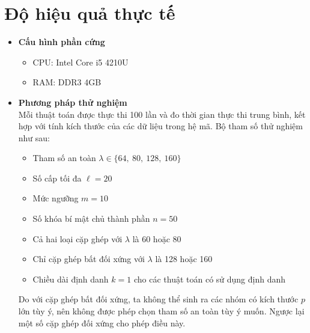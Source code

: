 \documentclass[class=report, crop=false]{standalone}
\begin{document}
	\newpage
	\section{Độ hiệu quả thực tế}
		
		\begin{itemize}
			\item[] {\sffamily\bfseries Cấu hình phần cứng}
			\begin{itemize}
				\item CPU: Intel Core i5 4210U
				\item RAM: DDR3 4GB
			\end{itemize}
			\item[] {\sffamily\bfseries Phương pháp thử nghiệm} \\
			Mỗi thuật toán được thực thi 100 lần và đo thời gian thực thi trung bình, kết hợp với tính kích thước của các dữ liệu trong hệ mã. Bộ tham số thử nghiệm như sau:
			\begin{itemize}
				\item Tham số an toàn $\lambda \in \{64,\ 80,\ 128,\ 160 \}$
				\item Số cấp tối đa $\ell = 20$
				\item Mức ngưỡng $m = 10$
				\item Số khóa bí mật chủ thành phần $n = 50$
				\item Cả hai loại cặp ghép với $\lambda$ là 60 hoặc 80
				\item Chỉ cặp ghép bất đối xứng với $\lambda$ là 128 hoặc 160
				\item Chiều dài định danh $k = 1$ cho các thuật toán có sử dụng định danh
			\end{itemize}
			Do với cặp ghép bất đối xứng, ta không thể sinh ra các nhóm có kích thước $p$ lớn tùy ý, nên không được phép chọn tham số an toàn tùy ý muốn. Ngược lại một số cặp ghép đối xứng cho phép điều này.


\end{itemize}
\end{document}
